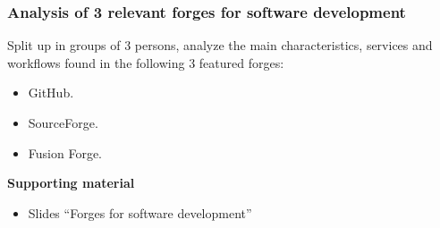\documentclass[a4paper]{article}
\begin{document}
\subsubsection{Analysis of 3 relevant forges for software development}
\label{sub:forges-analysis}

Split up in groups of 3 persons, analyze the main characteristics, services and workflows found in the following 3 featured forges:

\begin{itemize}
 \item GitHub.
 \item SourceForge.
 \item Fusion Forge.
\end{itemize}

\textbf{Supporting material}

\begin{itemize}
\item Slides ``Forges for software development''
\end{itemize}
\end{document}
